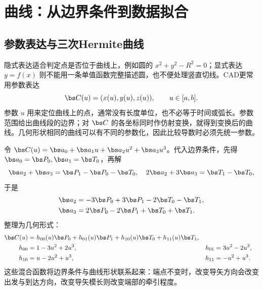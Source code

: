 \chapter{曲线：从边界条件到数据拟合}
\label{ch:curves}

\section{参数表达与三次Hermite曲线}

隐式表达适合判定点是否位于曲线上，例如圆的 $x^2+y^2-R^2=0$；显式表达 $y=f(x)$ 则不能用一条单值函数完整描述圆，也不便处理竖直切线。CAD更常用参数表达
\[
 \bs C(u)=(x(u),y(u),z(u)),\qquad u\in[a,b].
\]
参数 $u$ 用来定位曲线上的点，通常没有长度单位，也不必等于时间或弧长。参数范围给出曲线段的边界；对 $\bs C$ 的各坐标同时作仿射变换，就得到变换后的曲线。几何形状相同的曲线可以有不同的参数化，因此比较导数时必须先统一参数。


令 $\bs C(u)=\bs a_0+\bs a_1u+\bs a_2u^2+\bs a_3u^3$。代入边界条件，先得 $\bs a_0=\bs P_0,\bs a_1=\bs T_0$，再解
\[
 \bs a_2+\bs a_3=\bs P_1-\bs P_0-\bs T_0,\quad
 2\bs a_2+3\bs a_3=\bs T_1-\bs T_0,
\]
于是
\begin{align*}
 \bs a_2&=-3\bs P_0+3\bs P_1-2\bs T_0-\bs T_1,\\
 \bs a_3&=2\bs P_0-2\bs P_1+\bs T_0+\bs T_1.
\end{align*}
整理为几何形式：
\begin{align*}
 \bs C(u)&=h_{00}(u)\bs P_0+h_{01}(u)\bs P_1
             +h_{10}(u)\bs T_0+h_{11}(u)\bs T_1,\\
 h_{00}&=1-3u^2+2u^3,& h_{01}&=3u^2-2u^3,\\
 h_{10}&=u-2u^2+u^3,& h_{11}&=-u^2+u^3.
\end{align*}
这些混合函数将边界条件与曲线形状联系起来：端点不变时，改变导矢方向会改变出发与到达方向，改变导矢模长则改变端部的牵引程度。



